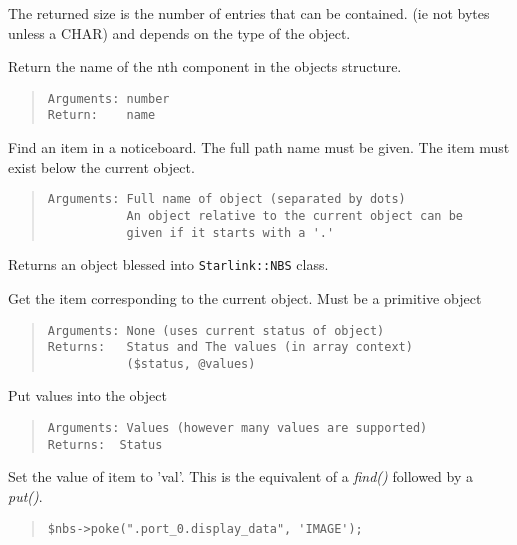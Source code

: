 \documentclass[twoside,11pt]{article}
\newenvironment{myquote}{\begin{quote}\begin{small}}{\end{small}\end{quote}}
\renewcommand{\_}{\texttt{\symbol{95}}}
\begin{document}
\begin{description}
The returned size is the number of entries that can be contained.
(ie not bytes unless a \_{}CHAR) and depends on the type of the object.

\item[nth\_{}name(num)] \mbox{}

Return the name of the nth component in the objects structure.
\begin{myquote}
\begin{verbatim}
Arguments: number
Return:    name
\end{verbatim}
\end{myquote}

\item[find] \mbox{}

Find an item in a noticeboard. The full path name must be given.
The item must exist below the current object.
\begin{myquote}
\begin{verbatim}
Arguments: Full name of object (separated by dots)
           An object relative to the current object can be
           given if it starts with a '.'
\end{verbatim}
\end{myquote}

Returns an object blessed into {\tt Starlink::NBS} class.

\item[get] \mbox{}

Get the item corresponding to the current object.
Must be a primitive object
\begin{myquote}
\begin{verbatim}
Arguments: None (uses current status of object)
Returns:   Status and The values (in array context)
           ($status, @values)
\end{verbatim}
\end{myquote} %

\item[put] \mbox{}

Put values into the object
\begin{myquote}
\begin{verbatim}
Arguments: Values (however many values are supported)
Returns:  Status
\end{verbatim}
\end{myquote}

\item[poke(item, val)] \mbox{}

Set the value of item to 'val'.
This is the equivalent of a {\em find()\/} followed by a {\em put()\/}.
\begin{myquote}
\begin{verbatim}
$nbs->poke(".port_0.display_data", 'IMAGE');
\end{verbatim}
\end{myquote} %


\end{description}
\end{document}

